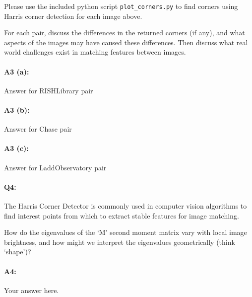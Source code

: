 Please use the included python script \texttt{plot\_corners.py} to find corners using Harris corner detection for each image above.

For each pair, discuss the differences in the returned corners (if any), and what aspects of the images may have caused these differences. Then discuss what real world challenges exist in matching features between images.


\paragraph{A3 (a):} Answer for RISHLibrary pair






\pagebreak
\paragraph{A3 (b):} Answer for Chase pair






\pagebreak
\paragraph{A3 (c):} Answer for LaddObservatory pair








\pagebreak
\paragraph{Q4:} 
The Harris Corner Detector is commonly used in computer vision algorithms to find interest points from which to extract stable features for image matching. 

How do the eigenvalues of the `M' second moment matrix vary with local image brightness, and how might we interpret the eigenvalues geometrically (think `shape')?

\paragraph{A4:} Your answer here.








